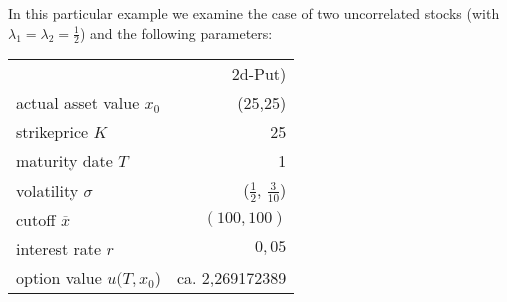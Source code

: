 In this particular example we examine the case of two uncorrelated stocks (with $\lambda_1=\lambda_2=\frac12$) and the following parameters:
 \begin{table}[hb]
    \centering
    \begin{tabular}{lr}
      \toprule 
 & 2d-Put)\\
       \cmidrule(l){2-2}
	 actual asset value $x_0$ 	&  (25,25)\\
	 strikeprice $K$			&  25 \\
	 maturity date $T$ 			& 1 \\
	 volatility $\sigma$		&  ($\frac12$, $\frac 3{10}$) \\
	 cutoff $\overline x$		& $(100,100)$\\
	 interest rate $r$ 				&  $0{,}05$\\
	 option value $u(T,x_0$)			& ca.  2{,}269172389 \\
      \bottomrule
    \end{tabular}
  \end{table}

